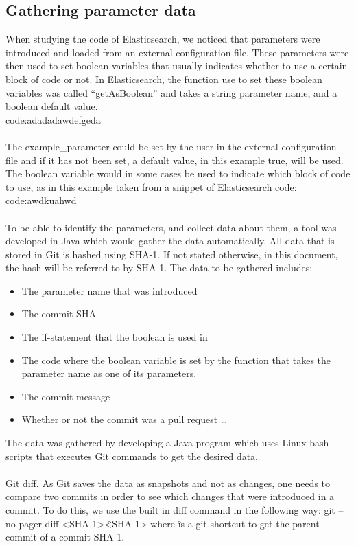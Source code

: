 \subsection{Gathering parameter data}
When studying the code of Elasticsearch, we noticed that parameters were introduced and loaded from an external configuration file. These parameters were then used to set boolean variables that usually indicates whether to use a certain block of code or not. In Elasticsearch, the function use to set these boolean variables was called “getAsBoolean” and takes a string parameter name, and a boolean default value.\\
code:adadadawdefgeda
\paragraph*{}
The example\_parameter could be set by the user in the external configuration file and if it has not been set, a default value, in this example true, will be used. The boolean variable would in some cases be used to indicate which block of code to use, as in this example taken from a snippet of Elasticsearch code:\\
code:awdkuahwd
\paragraph*{}
To be able to identify the parameters, and collect data about them, a tool was developed in Java which would gather the data automatically. All data that is stored in Git is hashed using SHA-1. If not stated otherwise, in this document, the hash will be referred to by SHA-1. The data to be gathered includes:
\begin{itemize}
\item The parameter name that was introduced
\item The commit SHA
\item The if-statement that the boolean is used in
\item The code where the boolean variable is set by the function that takes the parameter name as one of its parameters.
\item The commit message
\item Whether or not the commit was a pull request \ldots
\end{itemize}
The data was gathered by developing a Java program which uses Linux bash scripts that executes Git commands to get the desired data.
\paragraph*{}
Git diff. As Git saves the data as snapshots and not as changes, one needs to compare two commits in order to see which changes that were introduced in a commit. To do this, we use the built in diff command in the following way: 
git --no-pager diff <SHA-1>\^ <SHA-1>
where \^ is a git shortcut to get the parent commit of a commit SHA-1.
